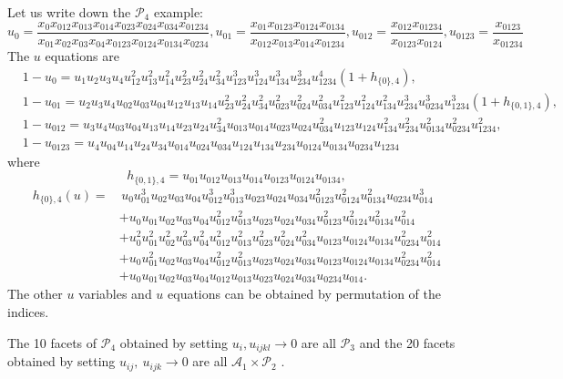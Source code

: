 \documentclass[hidelinks,12pt]{article}
\begin{document}
Let us write down the ${\mathscr P_4}$ example:
\[
u_0= \frac{x_{0} x_{012} x_{013} x_{014} x_{023} x_{024} x_{034} x_{01234}}{x_{01} x_{02} x_{03} x_{04} x_{0123} x_{0124} x_{0134} x_{0234}},
u_{01} =  \frac{x_{01} x_{0123} x_{0124} x_{0134}}{x_{012} x_{013} x_{014} x_{01234}},
u_{012} = \frac{x_{012} x_{01234}}{x_{0123} x_{0124}},
u_{0123} = \frac{x_{0123}}{x_{01234}}
\]
The $u$ equations are 
\begin{align*}
   &1-u_0=u_{1} u_{2} u_{3} u_{4} u_{12}^2 u_{13}^2 u_{14}^2 u_{23}^2 u_{24}^2 u_{34}^2 u_{123}^3 u_{124}^3 u_{134}^3 u_{234}^3u_{1234}^4 
    (1+h_{\{0\},4}),\\
   &1-u_{01}=u_{2} u_{3} u_{4} u_{02} u_{03} u_{04} u_{12} u_{13} u_{14} u_{23}^2 u_{24}^2 u_{34}^2 u_{023}^2 u_{024}^2 u_{034}^2 u_{123}^2 u_{124}^2 u_{134}^2 u_{234}^3 u_{0234}^3 u_{1234}^3(1+h_{\{0,1\},4}),\\
   &1-u_{012}=u_{3} u_{4} u_{03} u_{04} u_{13} u_{14} u_{23} u_{24} u_{34}^2 u_{013} u_{014} u_{023} u_{024} u_{034}^2 u_{123} u_{124} u_{134}^2 u_{234}^2 u_{0134}^2 u_{0234}^2 u_{1234}^2,\\ 
   &1-u_{0123}=u_{4} u_{04} u_{14} u_{24} u_{34} u_{014} u_{024} u_{034} u_{124} u_{134} u_{234} u_{0124} u_{0134} u_{0234} u_{1234}
\end{align*}
where 
\[
h_{\{0,1\},4}=u_{01} u_{012} u_{013} u_{014} u_{0123} u_{0124} u_{0134},
\]
\begin{align*}
h_{\{0\},4}(u)=&\,u_{0} u_{01}^3 u_{02} u_{03} u_{04} u_{012}^3 u_{013}^3 u_{023} u_{024} u_{034} u_{0123}^2 u_{0124}^2 u_{0134}^2 u_{0234} u_{014}^3\\
&+u_{0} u_{01} u_{02} u_{03} u_{04} u_{012}^2 u_{013}^2 u_{023} u_{024} u_{034} u_{0123}^2 u_{0124}^2 u_{0134}^2 u_{014}^2\\
&+u_{0}^2 u_{01}^2 u_{02}^2 u_{03}^2 u_{04}^2 u_{012}^2 u_{013}^2 u_{023}^2 u_{024}^2 u_{034}^2 u_{0123} u_{0124} u_{0134} u_{0234}^2 u_{014}^2\\
&+u_{0} u_{01}^2 u_{02} u_{03} u_{04} u_{012}^2 u_{013}^2 u_{023} u_{024} u_{034} u_{0123} u_{0124} u_{0134} u_{0234}^2 u_{014}^2\\
&+u_{0} u_{01} u_{02} u_{03} u_{04} u_{012} u_{013} u_{023} u_{024} u_{034} u_{0234} u_{014}.
\end{align*}
The other $u$ variables and $u$ equations can be obtained by permutation of the indices. %

The 10 facets of $\mathscr P_4$ obtained by setting $u_{i}, u_{i j k l} \rightarrow 0$ are all $\mathscr{P}_3$ and the 20 facets obtained by setting $u_{i j},~u_{i j k} \rightarrow 0$ are all $\mathscr{A}_1 \times \mathscr{P}_2$ . 



\end{document}
